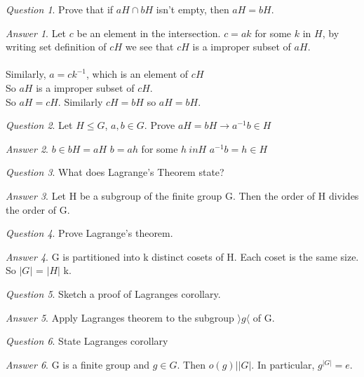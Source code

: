\documentclass[]{article}
\theoremstyle{remark}
\theoremstyle{qnstyle}
\newtheorem{question}{Question}
\theoremstyle{answerstyle}
\newtheorem*{answer}{Answer}
\begin{document}
\begin{question}
    Prove that if $aH \cap bH$ isn't empty, then $aH = bH$.
\end{question}
\begin{answer}
    Let $c$ be an element in the intersection.
    $c = ak$ for some $k$ in $H$, by writing set definition of $cH$ we see that $cH$ is a improper subset of $aH$.\\ \\
    Similarly, $a = ck^{-1}$, which is an element of $cH$ \\
    So $aH$ is a improper subset of $cH$. \\
    So $aH = cH$. Similarly $cH = bH$ so $aH = bH$.
\end{answer}


\begin{question}
    Let $H \leq G$, $a,b \in G$. Prove
    $aH = bH \rightarrow a^{-1}b \in H$
\end{question}
\begin{answer}
    $b \in bH = aH$
    $b = ah$ for some $h \ in H$
    $a^{-1}b = h \in H$
\end{answer}

\begin{question}
    What does Lagrange's Theorem state?
\end{question}
\begin{answer}
    Let H be a subgroup of the finite group G. Then the order of H divides the order of G.
\end{answer}

\begin{question}
    Prove Lagrange's theorem.
\end{question}
\begin{answer}
    G is partitioned into k distinct cosets of H. Each coset is the same size. So $\vert G\vert$ = $\vert H\vert$ k.
\end{answer}

\begin{question}
    Sketch a proof of Lagranges corollary.
\end{question}
\begin{answer}
    Apply Lagranges theorem to the subgroup $\rangle g \langle$ of G.
\end{answer}

\begin{question}
    State Lagranges corollary
\end{question}
\begin{answer}
    G is a finite group and $g \in G$. Then $o(g) \big \vert \vert G \vert$.
     In particular, $g^{\vert G \vert} = e$.
\end{answer}
\end{document}
